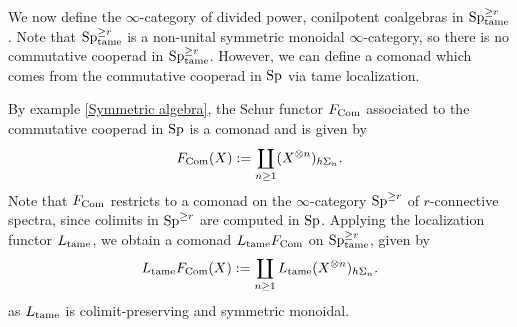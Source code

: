 We now define the $\infty$-category of divided power, conilpotent coalgebras in $\operatorname{Sp}_{\operatorname{\operatorname{tame}}}^{\geq r}$. Note that $\operatorname{Sp}_{\operatorname{\operatorname{tame}}}^{\geq r}$ is a non-unital symmetric monoidal $\infty$-category, so there is no commutative cooperad in $\operatorname{Sp}_{\operatorname{\operatorname{tame}}}^{\geq r}$. However, we can define a comonad which comes from the commutative cooperad in $\operatorname{Sp}$ via tame localization.

By example \ref{Symmetric algebra}, the Schur functor $F_{\operatorname{Com}}$ associated to the commutative cooperad in $\operatorname{Sp}$ is a comonad and is given by
$$
F_{\operatorname{Com}}(X) := \coprod_{n\geq 1} (X^{\otimes n})_{h\Sigma_n}.
$$
Note that $F_{\operatorname{Com}}$ restricts to a comonad on the $\infty$-category $\operatorname{Sp}^{\geq r}$ of $r$-connective spectra, since colimits in $\operatorname{Sp}^{\geq r}$ are computed in $\operatorname{Sp}$.
Applying the localization functor $L_{\operatorname{\operatorname{tame}}}$, we obtain a comonad $L_{\operatorname{\operatorname{tame}}}F_{\operatorname{Com}}$ on $\operatorname{Sp}_{\operatorname{\operatorname{tame}}}^{\geq r}$, given by 
\pagebreak
$$
L_{\operatorname{\operatorname{tame}}} F_{\operatorname{Com}}(X) := \coprod_{n\geq 1} L_{\operatorname{\operatorname{tame}}}(X^{\otimes n})_{h\Sigma_n}.
$$
as $L_{\operatorname{\operatorname{tame}}}$ is colimit-preserving and symmetric monoidal.


